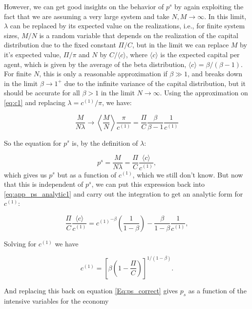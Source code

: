 However, we can get good insights on the behavior of $p^s$ by again exploiting the fact that we are assuming a very large system and take $N, M \to \infty$. In this limit, $\lambda$ can be replaced by its expected value on the realizations, i.e., for finite system sizes, $M/N$ is a random variable that depends on the realization of the capital distribution due to the fixed constant $\Pi/C$, but in the limit we can replace $M$ by it's expected value, $\Pi/\pi$ and $N$ by $C / \langle c \rangle$, where $\langle c \rangle$ is the expected capital per agent, which is given by the average of the beta distribution, $\langle c \rangle = \beta/(\beta-1)$. For finite $N$, this is only a reasonable approximation if $\beta \gg 1$, and breaks down in the limit $\beta \to 1^+$ due to the infinite variance of the capital distribution, but it should be accurate for all $\beta > 1$ in the limit $N \to \infty$. Using the approximation on \eqref{eq:c1} and replacing $\lambda = c^{(1)} / \pi$, we have:

\begin{equation}
\frac{M}{N \lambda} \to \left \langle \frac{M}{N} \right \rangle \frac{\pi}{c^{(1)}} = \frac{\Pi}{C} \frac{\beta}{\beta - 1} \frac{1}{c^{(1)}}
\end{equation}

So the equation for $p^s$ is, by the definition of $\lambda$:

\begin{equation}
 \label{Eq:ps_correct}
p^s = \frac{M}{N \lambda} = \frac{\Pi}{C} \frac{\langle c \rangle}{c^{(1)}},
\end{equation} 
which gives us $p^s$ but as a function of $c^{(1)}$, which we still don't know. But now that this is independent of $p^s$, we can put this expression back into \eqref{eq:app_ps_analytic1} and carry out the integration to get an analytic form for $c^{(1)}$:

\begin{equation}
\frac{\Pi}{C} \frac{\langle c \rangle}{c^{(1)}} = {c^{(1)}}^{-\beta} \left( \frac{1}{1-\beta} \right) - \frac{\beta}{1 - \beta } \frac{1}{c^{(1)}},
\end{equation}

Solving for $c^{(1)}$ we have

\begin{equation}
\label{Eq:c1_correct}
c^{(1)} = \left[\beta \left(  1 - \frac{\Pi}{C}\right) \right]^{1/(1 - \beta)}.
\end{equation}

And replacing this back on equation \eqref{Eq:ps_correct} gives $p_s$ as a function of the intensive variables for the economy

